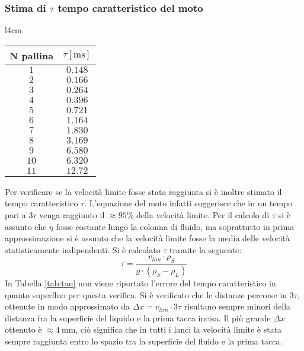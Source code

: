 \documentclass[a4paper,11pt,oneside]{article}
\begin{document}
\subsubsection*{Stima di $\tau$ tempo caratteristico del moto}
\begin{wraptable}{l}{4cm}
\centering
    \begin{tabular}{|c|c|}
        \hline
        \textbf{N pallina} & \textbf{$\tau [\si{\milli\second}]$} \\ \hline
        \rowcolor[rgb]{0.85,0.85,0.85}$1$ & $0.148$ \\ \hline
        $2$ & $0.166$ \\ \hline
        \rowcolor[rgb]{0.85,0.85,0.85}$3$ & $0.264$ \\ \hline
        $4$ & $0.396$ \\ \hline
        \rowcolor[rgb]{0.85,0.85,0.85}$5$ & $0.721$ \\ \hline
        $6$ & $1.164$ \\ \hline
        \rowcolor[rgb]{0.85,0.85,0.85}$7$ & $1.830$ \\ \hline
        $8$ & $3.169$ \\ \hline
        \rowcolor[rgb]{0.85,0.85,0.85}$9$ & $6.580$ \\ \hline
        $10$ & $6.320$ \\ \hline
        \rowcolor[rgb]{0.85,0.85,0.85}$11$ & $12.72$ \\ \hline
    \end{tabular}
    \caption{Tempo $\tau$}
    \label{tab:tau}
\end{wraptable}
Per verificare se la velocità limite fosse stata raggiunta si è inoltre stimato il tempo caratteristico $\tau$. L'equazione del moto infatti suggerisce che in un tempo pari a $3\tau$ venga raggiunto il $\approx 95\%$ della velocità limite.
Per il calcolo di $\tau$ si è assunto che $\eta$ fosse costante lungo la colonna di fluido, ma soprattutto in prima approssimazione si è assunto che la velocità limite fosse la media delle velocità statisticamente indipendenti.
Si è calcolato $\tau$ tramite la seguente:
\begin{equation*}
    \tau = \frac{v_{lim} \cdot \rho_{S}}{g \cdot (\rho_{S} - \rho_{L})}
\end{equation*}
In Tabella \ref{tab:tau} non viene riportato l'errore del tempo caratteristico in quanto superfluo per questa verifica. Si è verificato che le distanze percorse in $3\tau$, ottenute in modo approssimato da $\Delta x=v_{lim} \cdot 3 \tau$ risultano sempre minori della distanza fra la superficie del liquido e la prima tacca incisa. Il più grande $\Delta x$ ottenuto è $\approx \SI{4}{\milli\metre}$, ciò significa che in tutti i lanci la velocità limite è stata sempre raggiunta entro lo spazio tra la superficie del fluido e la prima tacca.%
\end{document}

